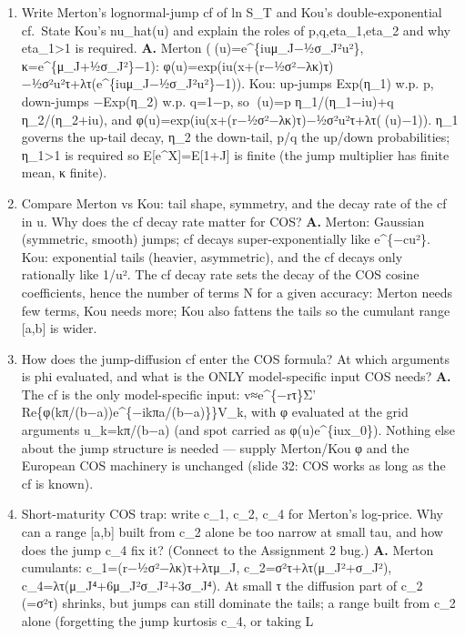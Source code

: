 \documentclass[
  11pt,
]{article}
\begin{document}
\begin{enumerate}
  λκ=λ(e\^{}\{μ\_J+½σ\_J²\}−1). Confusing E{[}J{]} with E{[}ξ{]}=μ\_J is
  the classic exponent error.
\item
  Write Merton's lognormal-jump cf of ln S\_T and Kou's
  double-exponential cf.~State Kou's nu\_hat(u) and explain the roles of
  p,q,eta\_1,eta\_2 and why eta\_1\textgreater1 is required. \textbf{A.}
  Merton ((u)=e\^{}\{iuμ\_J−½σ\_J²u²\}, κ=e\^{}\{μ\_J+½σ\_J²\}−1):
  φ(u)=exp(iu(x+(r−½σ²−λκ)τ)−½σ²u²τ+λτ(e\^{}\{iuμ\_J−½σ\_J²u²\}−1)).
  Kou: up-jumps Exp(η\_1) w.p. p, down-jumps −Exp(η\_2) w.p. q=1−p, so
  (u)=p η\_1/(η\_1−iu)+q η\_2/(η\_2+iu), and
  φ(u)=exp(iu(x+(r−½σ²−λκ)τ)−½σ²u²τ+λτ((u)−1)). η\_1 governs the
  up-tail decay, η\_2 the down-tail, p/q the up/down probabilities;
  η\_1\textgreater1 is required so E{[}e\^{}X{]}=E{[}1+J{]} is finite
  (the jump multiplier has finite mean, κ finite).
\item
  Compare Merton vs Kou: tail shape, symmetry, and the decay rate of the
  cf in u. Why does the cf decay rate matter for COS? \textbf{A.}
  Merton: Gaussian (symmetric, smooth) jumps; cf decays
  super-exponentially like e\^{}\{−cu²\}. Kou: exponential tails
  (heavier, asymmetric), and the cf decays only rationally like 1/u².
  The cf decay rate sets the decay of the COS cosine coefficients, hence
  the number of terms N for a given accuracy: Merton needs few terms,
  Kou needs more; Kou also fattens the tails so the cumulant range
  {[}a,b{]} is wider.
\item
  How does the jump-diffusion cf enter the COS formula? At which
  arguments is phi evaluated, and what is the ONLY model-specific input
  COS needs? \textbf{A.} The cf is the only model-specific input:
  v≈e\^{}\{−rτ\}Σ' Re\{φ(kπ/(b−a))e\^{}\{−ikπa/(b−a)\}\}V\_k, with φ
  evaluated at the grid arguments u\_k=kπ/(b−a) (and spot carried as
  φ(u)e\^{}\{iux\_0\}). Nothing else about the jump structure is needed
  --- supply Merton/Kou φ and the European COS machinery is unchanged
  (slide 32: COS works as long as the cf is known).
\item
  Short-maturity COS trap: write c\_1, c\_2, c\_4 for Merton's
  log-price. Why can a range {[}a,b{]} built from c\_2 alone be too
  narrow at small tau, and how does the jump c\_4 fix it? (Connect to
  the Assignment 2 bug.) \textbf{A.} Merton cumulants:
  c\_1=(r−½σ²−λκ)τ+λτμ\_J, c\_2=σ²τ+λτ(μ\_J²+σ\_J²),
  c\_4=λτ(μ\_J⁴+6μ\_J²σ\_J²+3σ\_J⁴). At small τ the diffusion part of
  c\_2 (=σ²τ) shrinks, but jumps can still dominate the tails; a range
  built from c\_2 alone (forgetting the jump kurtosis c\_4, or taking L

\end{enumerate}
\end{document}
